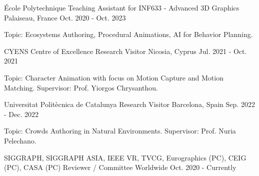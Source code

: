 

\begin{cventries}

\cventry
  {École Polytechnique} %
  {Teaching Assistant for INF633 - Advanced 3D Graphics} %
  {Palaiseau, France} %
  {Oct. 2020 - Oct. 2023} %
  {
    \begin{cvitemone} %
      \item {Topic: Ecosystems Authoring, Procedural Animations, AI for Behavior Planning.}
    \end{cvitemone}
  }

  \cventry
    {CYENS Centre of Excellence} %
    {Research Visitor} %
    {Nicosia, Cyprus} %
    {Jul. 2021 - Oct. 2021} %
    {
      \begin{cvitemone} %
        \item {Topic: Character Animation with focus on Motion Capture and Motion Matching. Supervisor: Prof. Yiorgos Chrysanthou.}
      \end{cvitemone}
    }

\cventry
    {Universitat Politècnica de Catalunya} %
    {Research Visitor} %
    {Barcelona, Spain} %
    {Sep. 2022 - Dec. 2022} %
    {
      \begin{cvitemone} %
        \item {Topic: Crowds Authoring in Natural Environments. Supervisor: Prof. Nuria Pelechano.}
      \end{cvitemone}
    }

\cventry
  {SIGGRAPH, SIGGRAPH ASIA, IEEE VR, TVCG, Eurographics (PC), CEIG (PC), CASA (PC)} %
  {Reviewer / Committee} %
  {Worldwide} %
  {Oct. 2020 - Currently} %
  {}

\end{cventries}
